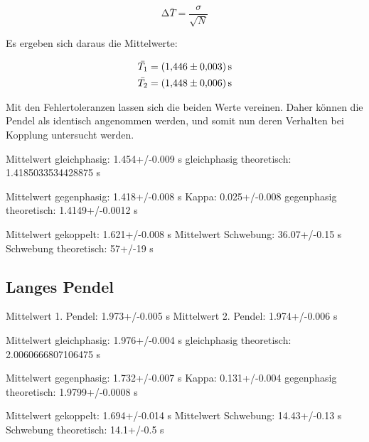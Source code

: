 \begin{equation}
    \label{eqn:Mittelwertfehler}
    \increment \bar{T} = \frac{\sigma}{\sqrt{N}} 
\end{equation}

Es ergeben sich daraus die Mittelwerte:

\begin{align*}
\bar{T_1} &= \qty{1.446+-0.003}{\second} \\
\bar{T_2} &= \qty{1.448+-0.006}{\second}
\end{align*}

Mit den Fehlertoleranzen lassen sich die beiden Werte vereinen.
Daher können die Pendel als identisch angenommen werden,
und somit nun deren Verhalten bei Kopplung untersucht werden.

Mittelwert gleichphasig: 1.454+/-0.009 s
gleichphasig theoretisch: 1.4185033534428875 s


Mittelwert gegenphasig: 1.418+/-0.008 s
Kappa: 0.025+/-0.008
gegenphasig theoretisch: 1.4149+/-0.0012 s


Mittelwert gekoppelt: 1.621+/-0.008 s
Mittelwert Schwebung: 36.07+/-0.15 s
Schwebung theoretisch: 57+/-19 s

\subsection{Langes Pendel}
\label{Langes Pendel}

Mittelwert 1. Pendel: 1.973+/-0.005 s
Mittelwert 2. Pendel: 1.974+/-0.006 s


Mittelwert gleichphasig: 1.976+/-0.004 s
gleichphasig theoretisch: 2.0060666807106475 s


Mittelwert gegenphasig: 1.732+/-0.007 s
Kappa: 0.131+/-0.004
gegenphasig theoretisch: 1.9799+/-0.0008 s


Mittelwert gekoppelt: 1.694+/-0.014 s
Mittelwert Schwebung: 14.43+/-0.13 s
Schwebung theoretisch: 14.1+/-0.5 s
